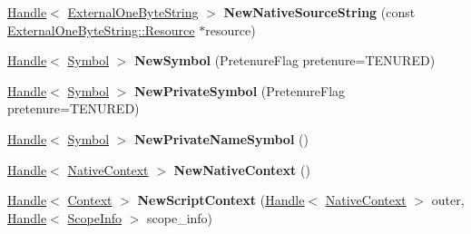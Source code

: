 \begin{DoxyCompactItemize}
\mbox{\hyperlink{classv8_1_1internal_1_1Handle}{Handle}}$<$ \mbox{\hyperlink{classv8_1_1internal_1_1ExternalOneByteString}{External\+One\+Byte\+String}} $>$ {\bfseries New\+Native\+Source\+String} (const \mbox{\hyperlink{classv8_1_1String_1_1ExternalOneByteStringResource}{External\+One\+Byte\+String\+::\+Resource}} $\ast$resource)
\item 
\mbox{\label{classv8_1_1internal_1_1Factory_a8f16c3f61a8cd6a465b25dbd6ef803ed}} 
\mbox{\hyperlink{classv8_1_1internal_1_1Handle}{Handle}}$<$ \mbox{\hyperlink{classv8_1_1internal_1_1Symbol}{Symbol}} $>$ {\bfseries New\+Symbol} (Pretenure\+Flag pretenure=T\+E\+N\+U\+R\+ED)
\item 
\mbox{\label{classv8_1_1internal_1_1Factory_a413f08c011cfbfba46c0f602f0c6cc64}} 
\mbox{\hyperlink{classv8_1_1internal_1_1Handle}{Handle}}$<$ \mbox{\hyperlink{classv8_1_1internal_1_1Symbol}{Symbol}} $>$ {\bfseries New\+Private\+Symbol} (Pretenure\+Flag pretenure=T\+E\+N\+U\+R\+ED)
\item 
\mbox{\label{classv8_1_1internal_1_1Factory_a89d04d8d94e6731deda3c76d526ffd1c}} 
\mbox{\hyperlink{classv8_1_1internal_1_1Handle}{Handle}}$<$ \mbox{\hyperlink{classv8_1_1internal_1_1Symbol}{Symbol}} $>$ {\bfseries New\+Private\+Name\+Symbol} ()
\item 
\mbox{\label{classv8_1_1internal_1_1Factory_a7f259196680809ee0912eb5ce73f5ce9}} 
\mbox{\hyperlink{classv8_1_1internal_1_1Handle}{Handle}}$<$ \mbox{\hyperlink{classv8_1_1internal_1_1NativeContext}{Native\+Context}} $>$ {\bfseries New\+Native\+Context} ()
\item 
\mbox{\label{classv8_1_1internal_1_1Factory_a8983cdc8d672e091e271c3b3de6577a9}} 
\mbox{\hyperlink{classv8_1_1internal_1_1Handle}{Handle}}$<$ \mbox{\hyperlink{classv8_1_1internal_1_1Context}{Context}} $>$ {\bfseries New\+Script\+Context} (\mbox{\hyperlink{classv8_1_1internal_1_1Handle}{Handle}}$<$ \mbox{\hyperlink{classv8_1_1internal_1_1NativeContext}{Native\+Context}} $>$ outer, \mbox{\hyperlink{classv8_1_1internal_1_1Handle}{Handle}}$<$ \mbox{\hyperlink{classv8_1_1internal_1_1ScopeInfo}{Scope\+Info}} $>$ scope\+\_\+info)
\item 
\mbox{\label{classv8_1_1internal_1_1Factory_a9a2fe62fe0e107ba45a3896ee4d87511}} 

\end{DoxyCompactItemize}
